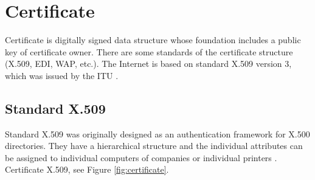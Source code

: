 \documentclass[
  digital, %
  notable,   %
  lof,     %
  lot,     %
]{fithesis3}
\begin{document}
\section{Certificate}
Certificate is digitally signed data structure whose foundation includes a public key of
certificate owner. There are some standards of the certificate structure (X.509, EDI, WAP, 
etc.). The Internet is based on standard X.509 version 3, which was issued by the ITU \cite{dostalek2016velky}. %

\subsection{Standard X.509}
Standard X.509 was originally designed as an authentication framework for X.500 
directories. They have a hierarchical structure and the individual attributes can be assigned to 
individual computers of companies or individual printers \cite{schmeh2006cryptography}. %
Certificate X.509, see Figure \ref{fig:certificate}.
\end{document}
